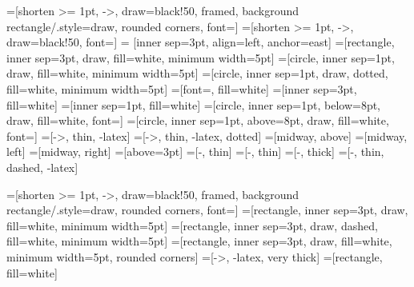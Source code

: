 \newcommand{\tcderivpac}[4]{\overset{#1,#2,#3}{\Rrightarrow}_{#4}}
\newcommand{\tderivpac}[4]{
	\ifx\relax#3\relax
	\overset{#1,#2}{\Rightarrow}_{#4}
	\else
	\overset{#1,#2,#3}{\Rightarrow}_{#4}
	\fi
}
\newcommand{\tderivpacn}[2]{\Rightarrow^{#2}_{#1}}
\newcommand{\tresolv}[1]{\overset{#1}{\rightarrowtail}}
\newcommand{\tresolvn}[2]{\overset{#1}{\rightarrowtail}^{#2}}
\newcommand{\tderivpactr}[1]{\Rightarrow^*_{#1}}
\newcommand{\tresolvtr}[1]{\rightarrowtail^*_{#1}}

\newcommand{\?}{\;\operatorname{\textbf{?}}\;}
\renewcommand{\:}{\;\operatorname{\textbf{:}}\;}
\newcommand{\Break}{\textbf{break}}
\newcommand{\Select}{\textbf{select}}
\newcommand{\Program}{\textbf{program}\;}
\newcommand{\Just}{\operatorname{\text{Just}}\;}
\newcommand{\Nothing}{\operatorname{\text{Nothing}}\;}
\newcommand{\pto}{\nrightarrow}
\newcommand{\ptree}[3]{
	\ifx&#2&%
	(#1 \rightrightarrows #3)
	\else
	(#1^#2 \rightrightarrows #3)
	\fi
}

=[shorten >= 1pt, ->, draw=black!50, framed, background rectangle/.style={draw, rounded corners}, font=\scriptsize ]
=[shorten >= 1pt, ->, draw=black!50, font=\scriptsize]
 = [inner sep=3pt, align=left, anchor=east]
=[rectangle, inner sep=3pt, draw, fill=white, minimum width=5pt]
=[circle, inner sep=1pt, draw, fill=white, minimum width=5pt]
=[circle, inner sep=1pt, draw, dotted, fill=white, minimum width=5pt]
=[font=\Large, fill=white]
=[inner sep=3pt, fill=white]
=[inner sep=1pt, fill=white]
=[circle, inner sep=1pt, below=8pt, draw, fill=white, font=\tiny]
=[circle, inner sep=1pt, above=8pt, draw, fill=white, font=\tiny]
=[->, thin, -latex]
=[->, thin, -latex, dotted]
=[midway, above]
=[midway, left]
=[midway, right]
=[above=3pt]
=[-, thin]
=[-, thin]
=[-, thick]
=[-, thin, dashed, -latex]

\newcommand{\ridX}{-0.3}
\newcommand{\ridY}{0.5}
\newcommand{\lhsX}{-0.3}
\newcommand{\pipeUY}{-0.5}
\newcommand{\pipeBY}{0.5}

=[shorten >= 1pt, ->, draw=black!50, framed, background rectangle/.style={draw, rounded corners}, font=\scriptsize ]
=[rectangle, inner sep=3pt, draw, fill=white, minimum width=5pt]
=[rectangle, inner sep=3pt, draw, dashed, fill=white, minimum width=5pt]
=[rectangle, inner sep=3pt, draw, fill=white, minimum width=5pt, rounded corners]
=[->, -latex, very thick]
=[rectangle, fill=white]